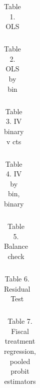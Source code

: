 \documentclass[12pt]{article}
\begin{document}
\begin{table}[htbp]\centering
\def\sym#1{\ifmmode^{#1}\else\(^{#1}\)\fi}
\caption{Table 1. OLS}
\begin{tabular}{lcccccc}
    
\end{tabular}
\end{table}


\begin{table}[htbp]\centering
\def\sym#1{\ifmmode^{#1}\else\(^{#1}\)\fi}
\caption{Table 2. OLS by bin}
\begin{tabular}{lcccccc}
    
\end{tabular}
\end{table}

\begin{table}[htbp]\centering
\def\sym#1{\ifmmode^{#1}\else\(^{#1}\)\fi}
\caption{Table 3. IV binary v cts}
\begin{tabular}{lcccccc}
    
\end{tabular}
\end{table}

\begin{table}[htbp]\centering
\def\sym#1{\ifmmode^{#1}\else\(^{#1}\)\fi}
\caption{Table 4. IV by bin, binary}
\begin{tabular}{lcccccc}
    
\end{tabular}
\end{table}

\begin{table}[htbp]\centering
\def\sym#1{\ifmmode^{#1}\else\(^{#1}\)\fi}
\caption{Table 5. Balance check}
\begin{tabular}{lcc}
    
\end{tabular}
\end{table}

\begin{table}[htbp]\centering
\def\sym#1{\ifmmode^{#1}\else\(^{#1}\)\fi}
\caption{Table 6. Residual Test}
\begin{tabular}{lccc}
  
\end{tabular}
\end{table}



\begin{table}[htbp]\centering
\def\sym#1{\ifmmode^{#1}\else\(^{#1}\)\fi}
\caption{Table 7. Fiscal treatment regression, pooled probit estimators}
\begin{tabular}{lcccc}
    
\end{tabular}
\end{table}
\end{document}
